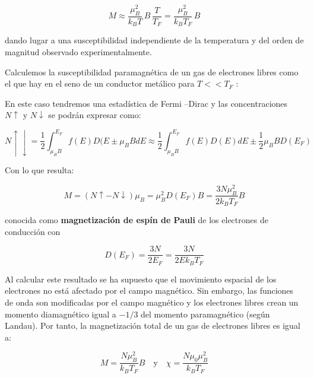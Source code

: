 \begin{equation}
 M \approx \frac{\mu_{B}^{2}}{k_{B}T}\, B\, \frac{T}{T_{F}} = \frac{\mu_{B}^{2}}{k_{B}T_{F}}\, B
\end{equation}

dando lugar a una susceptibilidad independiente de la temperatura y del orden de magnitud observado experimentalmente.

Calculemos la susceptibilidad paramagnética de un gas de electrones libres como el que hay en el seno de un
conductor metálico para $T << T_{F}$ :




En este caso tendremos una estadística de Fermi –Dirac y las concentraciones $N\uparrow$ y $N\downarrow$ se podrán expresar como:

\begin{equation}
  N\uparrow\downarrow = \frac{1}{2} \int_{\mu_{B}B}^{E_{F}} f(E)D(E\pm \mu_{B}B dE \approx 
            \frac{1}{2} \int_{\mu_{B}B}^{E_{F}} f(E)D(E) dE \pm \frac{1}{2}\mu_{B}B D(E_{F}) 
\end{equation}

Con lo que resulta:

\begin{equation}
  M = (N\uparrow-N\downarrow)\mu_{B} = \mu_{B}^{2}D(E_{F})B = \frac{3N\mu_{B}^{2}}{2k_{B}T_{F}}B
\end{equation}

conocida como \textbf{magnetización de espín de Pauli} de los electrones de conducción con

\begin{equation}
  D(E_{F}) = \frac{3N}{2E_{F}} = \frac{3N}{2Ek_{B}T_{F}} 
\end{equation}

Al calcular este resultado se ha supuesto que el movimiento espacial de los electrones no está afectado por el campo magnético. Sin embargo, las funciones de onda son modificadas por el campo magnético y los electrones libres crean un momento diamagnético igual a $-1/3$ del momento paramagnético (según Landau).
Por tanto, la magnetización total de un gas de electrones libres es igual a:

\begin{equation}
  M = \frac{N\mu_{B}^{2}}{k_{B}T_{F}}B \quad \text{y} \quad \chi=\frac{N\mu_{0}\mu_{B}^{2}}{k_{B}T_{F}} 
\end{equation}

